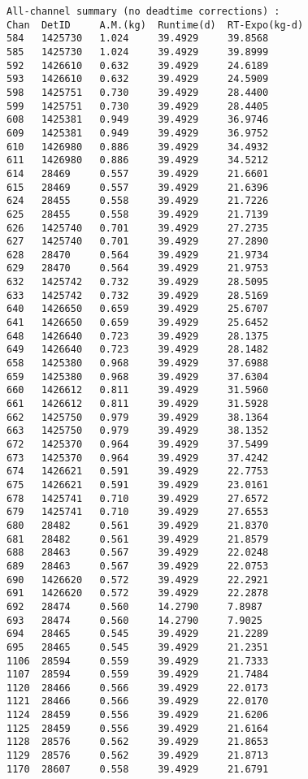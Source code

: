 \documentclass[notitlepage,rmp,aps,10pt]{revtex4-1}
\begin{document}
\begin{verbatim}
All-channel summary (no deadtime corrections) :
Chan  DetID     A.M.(kg)  Runtime(d)  RT-Expo(kg-d)
584   1425730   1.024     39.4929     39.8568
585   1425730   1.024     39.4929     39.8999
592   1426610   0.632     39.4929     24.6189
593   1426610   0.632     39.4929     24.5909
598   1425751   0.730     39.4929     28.4400
599   1425751   0.730     39.4929     28.4405
608   1425381   0.949     39.4929     36.9746
609   1425381   0.949     39.4929     36.9752
610   1426980   0.886     39.4929     34.4932
611   1426980   0.886     39.4929     34.5212
614   28469     0.557     39.4929     21.6601
615   28469     0.557     39.4929     21.6396
624   28455     0.558     39.4929     21.7226
625   28455     0.558     39.4929     21.7139
626   1425740   0.701     39.4929     27.2735
627   1425740   0.701     39.4929     27.2890
628   28470     0.564     39.4929     21.9734
629   28470     0.564     39.4929     21.9753
632   1425742   0.732     39.4929     28.5095
633   1425742   0.732     39.4929     28.5169
640   1426650   0.659     39.4929     25.6707
641   1426650   0.659     39.4929     25.6452
648   1426640   0.723     39.4929     28.1375
649   1426640   0.723     39.4929     28.1482
658   1425380   0.968     39.4929     37.6988
659   1425380   0.968     39.4929     37.6304
660   1426612   0.811     39.4929     31.5960
661   1426612   0.811     39.4929     31.5928
662   1425750   0.979     39.4929     38.1364
663   1425750   0.979     39.4929     38.1352
672   1425370   0.964     39.4929     37.5499
673   1425370   0.964     39.4929     37.4242
674   1426621   0.591     39.4929     22.7753
675   1426621   0.591     39.4929     23.0161
678   1425741   0.710     39.4929     27.6572
679   1425741   0.710     39.4929     27.6553
680   28482     0.561     39.4929     21.8370
681   28482     0.561     39.4929     21.8579
688   28463     0.567     39.4929     22.0248
689   28463     0.567     39.4929     22.0753
690   1426620   0.572     39.4929     22.2921
691   1426620   0.572     39.4929     22.2878
692   28474     0.560     14.2790     7.8987
693   28474     0.560     14.2790     7.9025
694   28465     0.545     39.4929     21.2289
695   28465     0.545     39.4929     21.2351
1106  28594     0.559     39.4929     21.7333
1107  28594     0.559     39.4929     21.7484
1120  28466     0.566     39.4929     22.0173
1121  28466     0.566     39.4929     22.0170
1124  28459     0.556     39.4929     21.6206
1125  28459     0.556     39.4929     21.6164
1128  28576     0.562     39.4929     21.8653
1129  28576     0.562     39.4929     21.8713
1170  28607     0.558     39.4929     21.6791

\end{verbatim}
\end{document}
